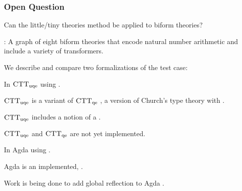 \documentclass[t,12pt,numbers,fleqn]{beamer}
\newcommand{\churchqe}{$\mbox{\sc CTT}_{\rm qe}$}
\newcommand{\churchuqe}{$\mbox{\sc CTT}_{\rm uqe}$}
\begin{document}

\begin{frame}
\frametitle{Open Question}
\bi

  \item Can the little/tiny theories method be applied to biform
    theories?

  \item {}: A graph of eight biform theories that encode
    natural number arithmetic and include a variety of transformers.

  \item We describe and compare two formalizations of the test case:

  \be

    \item In {\churchuqe} \bbrown{[Far17]} using .

    \bi

      \item {\churchuqe} is a variant of {\churchqe}
        , a version of Church's type theory
        with .

      \item {\churchuqe} includes a notion of a .

      \item {\churchuqe} and {\churchqe} are not yet implemented.

    \ei

    \item In Agda using .

    \bi

      \item Agda is an implemented, .

      \item Work is being done to add global reflection to Agda \bbrown{[WS12]}.

    \ei

  \ee

\ei
\end{frame}

\end{document}
